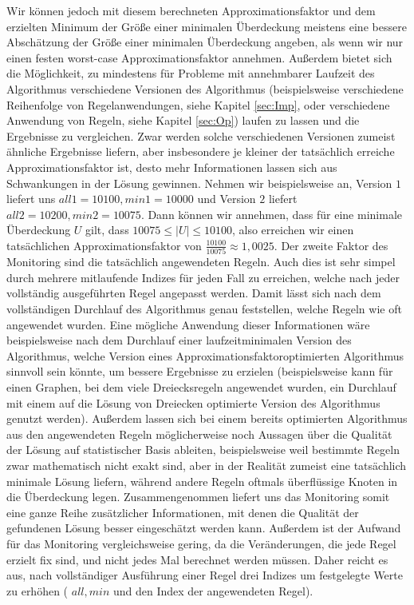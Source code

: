 \documentclass[12pt,onecolumn, notitlepage]{scrartcl}
\begin{document}
Wir können jedoch mit diesem berechneten Approximationsfaktor und dem erzielten Minimum der Größe einer minimalen Überdeckung meistens eine bessere Abschätzung der Größe einer minimalen Überdeckung angeben, als wenn wir nur einen festen worst-case Approximationsfaktor annehmen. Außerdem bietet sich die Möglichkeit, zu mindestens für Probleme mit annehmbarer Laufzeit des Algorithmus verschiedene Versionen des Algorithmus (beispielsweise verschiedene Reihenfolge von Regelanwendungen, siehe Kapitel \ref{sec:Imp}, oder verschiedene Anwendung von Regeln, siehe Kapitel \ref{sec:Op}) laufen zu lassen und die Ergebnisse zu vergleichen. Zwar werden solche verschiedenen Versionen zumeist ähnliche Ergebnisse liefern, aber insbesondere je kleiner der tatsächlich erreiche Approximationsfaktor ist, desto mehr Informationen lassen sich aus Schwankungen in der Lösung gewinnen. Nehmen wir beispielsweise an, Version $1$ liefert uns $all1 = 10100, min1 = 10000$ und Version $2$ liefert $all2 = 10200, min2 = 10075$. Dann können wir annehmen, dass für eine minimale Überdeckung $U$ gilt, dass $ 10075 \leq |U| \leq 10100$, also erreichen wir einen tatsächlichen Approximationsfaktor von $\frac{10100}{10075} \approx 1,0025$. \newline
Der zweite Faktor des Monitoring sind die tatsächlich angewendeten Regeln. Auch dies ist sehr simpel durch mehrere mitlaufende Indizes für jeden Fall zu erreichen, welche nach jeder vollständig ausgeführten Regel angepasst werden. Damit lässt sich nach dem vollständigen Durchlauf des Algorithmus genau feststellen, welche Regeln wie oft angewendet wurden. Eine mögliche Anwendung dieser Informationen wäre beispielsweise nach dem Durchlauf einer laufzeitminimalen Version des Algorithmus, welche Version eines Approximationsfaktoroptimierten Algorithmus sinnvoll sein könnte, um bessere Ergebnisse zu erzielen (beispielsweise kann für einen Graphen, bei dem viele Dreiecksregeln angewendet wurden, ein Durchlauf mit einem auf die Lösung von Dreiecken optimierte Version des Algorithmus genutzt werden). Außerdem lassen sich bei einem bereits optimierten Algorithmus aus den angewendeten Regeln möglicherweise noch Aussagen über die Qualität der Lösung auf statistischer Basis ableiten, beispielsweise weil bestimmte Regeln zwar mathematisch nicht exakt sind, aber in der Realität zumeist eine tatsächlich minimale Lösung liefern, während andere Regeln oftmals überflüssige Knoten in die Überdeckung legen. \newline
Zusammengenommen liefert uns das Monitoring somit eine ganze Reihe zusätzlicher Informationen, mit denen die Qualität der gefundenen Lösung besser eingeschätzt werden kann. Außerdem ist der Aufwand für das Monitoring vergleichsweise gering, da die Veränderungen, die jede Regel erzielt fix sind, und nicht jedes Mal berechnet werden müssen. Daher reicht es aus, nach vollständiger Ausführung einer Regel drei Indizes um festgelegte Werte zu erhöhen ( $all, min$ und den Index der angewendeten Regel).\newline
\end{document}
